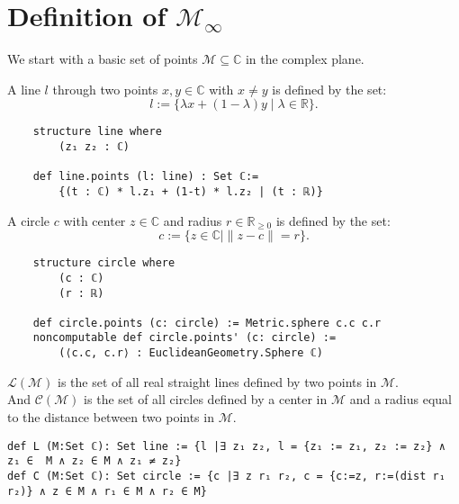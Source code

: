 \section{Definition of $\mathcal{M}_{\infty}$}
We start with a basic set of points $\mathcal{M} \subseteq \mathbb{C}$ in the complex plane. 

\begin{definition}[Line]
    \label{def:line}
    A line $l$ through two points $x,y\in\mathbb{C}$ with $x\ne y$ is defined by the set: $$l:=\{\lambda x+(1-\lambda)y\mid\lambda\in\mathbb{R}\}.$$
\end{definition}

\begin{lstlisting}
    structure line where
        (z₁ z₂ : ℂ)

    def line.points (l: line) : Set ℂ:= 
        {(t : ℂ) * l.z₁ + (1-t) * l.z₂ | (t : ℝ)}
\end{lstlisting}

\begin{definition}[Circle]
    \label{def:circle}
    A circle $c$ with center $z\in\mathbb{C}$ and radius $r\in\mathbb{R}_{\ge 0}$ is defined by the set: $$c:=\{z\in\mathbb{C} \mid\|z-c\|=r\}.$$
\end{definition}

\begin{lstlisting}
    structure circle where
        (c : ℂ)
        (r : ℝ)

    def circle.points (c: circle) := Metric.sphere c.c c.r
    noncomputable def circle.points' (c: circle) := 
        (⟨c.c, c.r⟩ : EuclideanGeometry.Sphere ℂ)
\end{lstlisting}


\begin{definition}
    \label{def:set_of_lines_and_circles}
    $\mathcal{L(M)}$ is the set of all real straight lines defined by two points in $\mathcal{M}$.\\
    And $\mathcal{C(M)}$ is the set of all circles defined by a center in $\mathcal{M}$ and a radius equal to the distance between two points in $\mathcal{M}$.
\end{definition}

\begin{lstlisting}
def L (M:Set ℂ): Set line := {l |∃ z₁ z₂, l = {z₁ := z₁, z₂ := z₂} ∧ z₁ ∈  M ∧ z₂ ∈ M ∧ z₁ ≠ z₂}
def C (M:Set ℂ): Set circle := {c |∃ z r₁ r₂, c = {c:=z, r:=(dist r₁ r₂)} ∧ z ∈ M ∧ r₁ ∈ M ∧ r₂ ∈ M}
\end{lstlisting}

